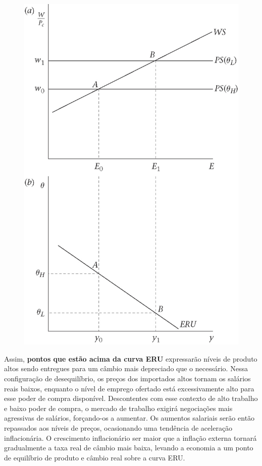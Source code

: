 \documentclass[a4paper,12pt]{article}[abntex2]
\begin{document}
\begin{figure}[H]
    \centering
    \includegraphics[width=0.7\linewidth]{Imagens/a26i2.png}
\end{figure}

Assim, \textbf{pontos que estão acima da curva ERU} expressarão níveis de produto altos sendo entregues para um câmbio  mais depreciado que o necessário. Nessa configuração de desequilíbrio,  os preços dos importados  altos  tornam  os  salários  reais  baixos,  enquanto  o  nível  de  emprego  ofertado  está excessivamente alto para esse poder de compra disponível. Descontentes com esse contexto de alto trabalho e baixo poder de compra, o mercado de trabalho exigirá negociações mais agressivas de salários, forçando-os a aumentar. Os aumentos salariais serão então repassados aos níveis de preços, ocasionando uma tendência de aceleração inflacionária. O crescimento inflacionário ser maior que a inflação externa tornará gradualmente a taxa real de câmbio mais baixa, levando a economia a um ponto de equilíbrio de produto e câmbio real sobre a curva ERU.
\end{document}
